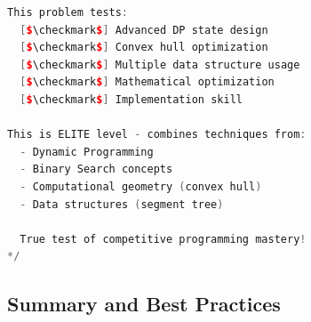 \documentclass[11pt,a4paper,oneside]{book}
\begin{document}
\begin{lstlisting}[language=C++, caption=ELITE Problem 1 - Multi-Dimensional Binary Search]
This problem tests:
  [$\checkmark$] Advanced DP state design
  [$\checkmark$] Convex hull optimization
  [$\checkmark$] Multiple data structure usage
  [$\checkmark$] Mathematical optimization
  [$\checkmark$] Implementation skill

This is ELITE level - combines techniques from:
  - Dynamic Programming
  - Binary Search concepts
  - Computational geometry (convex hull)
  - Data structures (segment tree)
  
  True test of competitive programming mastery!
*/
\end{lstlisting}


\subsection{Summary and Best Practices}
\end{document}
